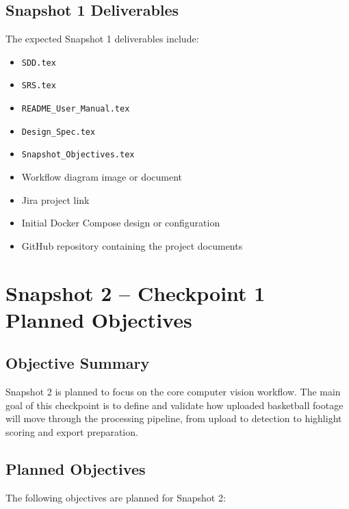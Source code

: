 \documentclass[12pt]{article}
\begin{document}
\subsection{Snapshot 1 Deliverables}
The expected Snapshot 1 deliverables include:

\begin{itemize}[noitemsep]
    \item \texttt{SDD.tex}
    \item \texttt{SRS.tex}
    \item \texttt{README\_User\_Manual.tex}
    \item \texttt{Design\_Spec.tex}
    \item \texttt{Snapshot\_Objectives.tex}
    \item Workflow diagram image or document
    \item Jira project link
    \item Initial Docker Compose design or configuration
    \item GitHub repository containing the project documents
\end{itemize}

\section{Snapshot 2 -- Checkpoint 1 Planned Objectives}

\subsection{Objective Summary}
Snapshot 2 is planned to focus on the core computer vision workflow. The main goal of this checkpoint is to define and validate how uploaded basketball footage will move through the processing pipeline, from upload to detection to highlight scoring and export preparation.

\subsection{Planned Objectives}
The following objectives are planned for Snapshot 2:
\end{document}
